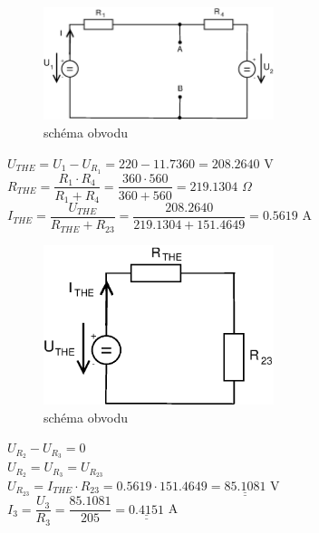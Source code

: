 \documentclass[10pt,a4paper]{article}
\def\doubleunderline#1{\underline{\underline{#1}}}
\begin{document}
\begin{figure}[ht]
    \begin{center}
     \includegraphics[width=0.6\textwidth]{2023.eps}
     \caption{schéma obvodu}
    \end{center}
   \end{figure}   
   \newpage 
  
  \begin{center}
   \begin{large}
   $ U_{THE} = U_1 - U_{R_1} = 220 - 11.7360 = 208.2640  $ V 
   \\[6pt]
   $ R_{THE} = \dfrac{R_1 \cdot R_4}{ R_1 +R_4}= \dfrac{360 \cdot 560}{360 + 560} =219.1304  $ $\Omega $ 
   \\[6pt]
   $ I_{THE} = \dfrac{U_{THE}}{R_{THE} + R_{23}} = \dfrac{208.2640}{219.1304 + 151.4649}  = 0.5619  $ A 
   \end{large}
  \end{center}
  
  \begin{figure}[ht]
    \begin{center}
     \includegraphics[width=0.6\textwidth]{2024.eps}
     \caption{schéma obvodu}
    \end{center}
   \end{figure} 
  
   \begin{center}
   \begin{large}
   $ U_{R_2} - U_{R_3} = 0 $
   \\[6pt]
   $ U_{R_2} = U_{R_3} = U_{R_{23}} $
   \\[6pt]
   $ U_{R_{23}} = I_{THE} \cdot R_{23} = 0.5619 \cdot 151.4649 = \doubleunderline{85.1081} $ V
   \\[6pt]
   $I_3 = \dfrac{U_3}{R_3} = \dfrac{85.1081}{205} = \doubleunderline{0.4151} $ A 
   \\[20pt]
   \end{large}
  \end{center}
  
\end{document}
